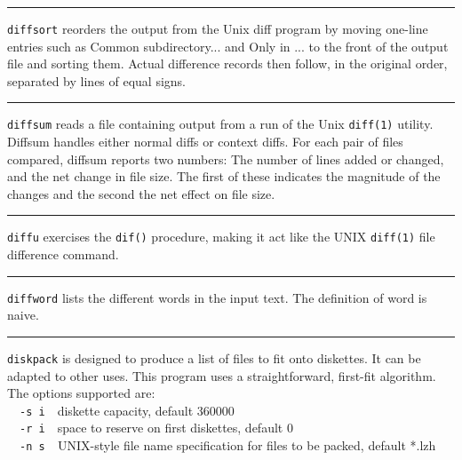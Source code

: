 {{{{{\vspace{0.25cm}\hrule{}

\texttt{diffsort} reorders the output from the Unix
{\textquotedbl}diff{\textquotedbl} program by moving one-line entries
such as {\textquotedbl}Common subdirectory...{\textquotedbl} and
{\textquotedbl}Only in ...{\textquotedbl} to the front of the output
file and sorting them. Actual difference records then follow, in the
original order, separated by lines of equal signs. 

\vspace{0.25cm}\hrule{}

\texttt{diffsum} reads a file containing output from a run of the Unix
\texttt{diff(1)} utility. Diffsum handles either normal diffs or
context diffs. For each pair of files compared, diffsum reports two
numbers: The number of lines added or changed, and the net change in
file size. The first of these indicates the magnitude of the changes
and the second the net effect on file size. 

\vspace{0.25cm}\hrule{}

\texttt{diffu} exercises the \texttt{dif()} procedure, making it act
like the UNIX \texttt{diff(1)} file difference command.

\vspace{0.25cm}\hrule{}

\texttt{diffword} lists the different words in the input text. The
definition of {\textquotedbl}word{\textquotedbl} is naive. 

\vspace{0.25cm}\hrule{}

\texttt{diskpack} is designed to produce a list of files to fit onto
\index{diskettes}diskettes. It can be adapted to other uses. This
program uses a straightforward, first-fit algorithm. The options
supported are:\\
\ \ \texttt{{}-s i}\ \ diskette capacity, default 360000\\
\ \ \texttt{{}-r i}\ \ space to reserve on first diskettes, default
0\\
\ \ \texttt{{}-n s}\texttt{\ \ }UNIX-style file name specification for
files to be packed, default {\textquotedbl}*.lzh{\textquotedbl}

}}}}}

